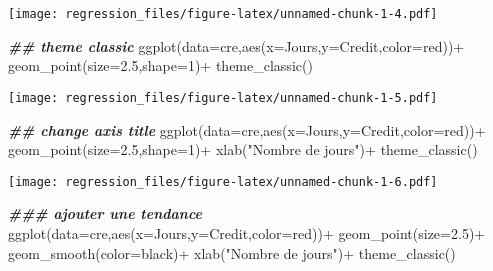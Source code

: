 \documentclass[
]{article}
\newenvironment{Shaded}{\begin{snugshade}}{\end{snugshade}}
\newcommand{\AttributeTok}[1]{\textcolor[rgb]{0.77,0.63,0.00}{#1}}
\newcommand{\DecValTok}[1]{\textcolor[rgb]{0.00,0.00,0.81}{#1}}
\newcommand{\DocumentationTok}[1]{\textcolor[rgb]{0.56,0.35,0.01}{\textbf{\textit{#1}}}}
\newcommand{\FloatTok}[1]{\textcolor[rgb]{0.00,0.00,0.81}{#1}}
\newcommand{\FunctionTok}[1]{\textcolor[rgb]{0.00,0.00,0.00}{#1}}
\newcommand{\NormalTok}[1]{#1}
\newcommand{\SpecialCharTok}[1]{\textcolor[rgb]{0.00,0.00,0.00}{#1}}
\newcommand{\StringTok}[1]{\textcolor[rgb]{0.31,0.60,0.02}{#1}}
\begin{document}
\texttt{[image: regression\_files/figure-latex/unnamed-chunk-1-4.pdf]}

\begin{Shaded}
\begin{Highlighting}[]
\DocumentationTok{\#\# theme classic}
\FunctionTok{ggplot}\NormalTok{(}\AttributeTok{data=}\NormalTok{cre,}\FunctionTok{aes}\NormalTok{(}\AttributeTok{x=}\NormalTok{Jours,}\AttributeTok{y=}\NormalTok{Credit,}\AttributeTok{color=}\StringTok{\textquotesingle{}red\textquotesingle{}}\NormalTok{))}\SpecialCharTok{+}
  \FunctionTok{geom\_point}\NormalTok{(}\AttributeTok{size=}\FloatTok{2.5}\NormalTok{,}\AttributeTok{shape=}\DecValTok{1}\NormalTok{)}\SpecialCharTok{+}
  \FunctionTok{theme\_classic}\NormalTok{()}
\end{Highlighting}
\end{Shaded}

\texttt{[image: regression\_files/figure-latex/unnamed-chunk-1-5.pdf]}

\begin{Shaded}
\begin{Highlighting}[]
\DocumentationTok{\#\# change axis title}
\FunctionTok{ggplot}\NormalTok{(}\AttributeTok{data=}\NormalTok{cre,}\FunctionTok{aes}\NormalTok{(}\AttributeTok{x=}\NormalTok{Jours,}\AttributeTok{y=}\NormalTok{Credit,}\AttributeTok{color=}\StringTok{\textquotesingle{}red\textquotesingle{}}\NormalTok{))}\SpecialCharTok{+}
  \FunctionTok{geom\_point}\NormalTok{(}\AttributeTok{size=}\FloatTok{2.5}\NormalTok{,}\AttributeTok{shape=}\DecValTok{1}\NormalTok{)}\SpecialCharTok{+}
  \FunctionTok{xlab}\NormalTok{(}\StringTok{"Nombre de jours"}\NormalTok{)}\SpecialCharTok{+}
  \FunctionTok{theme\_classic}\NormalTok{()}
\end{Highlighting}
\end{Shaded}

\texttt{[image: regression\_files/figure-latex/unnamed-chunk-1-6.pdf]}

\begin{Shaded}
\begin{Highlighting}[]
\DocumentationTok{\#\#\# ajouter une tendance}
\FunctionTok{ggplot}\NormalTok{(}\AttributeTok{data=}\NormalTok{cre,}\FunctionTok{aes}\NormalTok{(}\AttributeTok{x=}\NormalTok{Jours,}\AttributeTok{y=}\NormalTok{Credit,}\AttributeTok{color=}\StringTok{\textquotesingle{}red\textquotesingle{}}\NormalTok{))}\SpecialCharTok{+}
  \FunctionTok{geom\_point}\NormalTok{(}\AttributeTok{size=}\FloatTok{2.5}\NormalTok{)}\SpecialCharTok{+}
  \FunctionTok{geom\_smooth}\NormalTok{(}\AttributeTok{color=}\StringTok{\textquotesingle{}black\textquotesingle{}}\NormalTok{)}\SpecialCharTok{+}
  \FunctionTok{xlab}\NormalTok{(}\StringTok{"Nombre de jours"}\NormalTok{)}\SpecialCharTok{+}
  \FunctionTok{theme\_classic}\NormalTok{()}
\end{Highlighting}
\end{Shaded}
\end{document}
